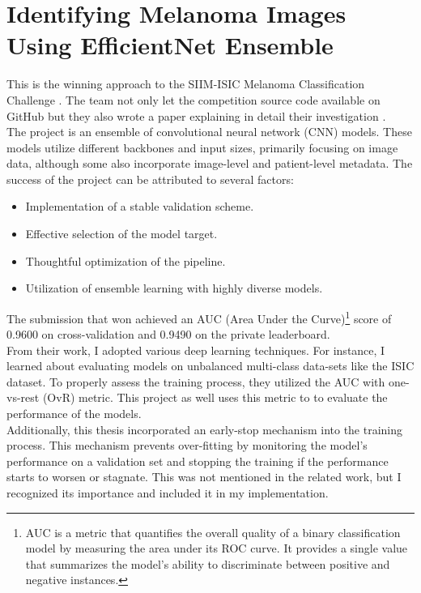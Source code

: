 \section{Identifying Melanoma Images Using EfficientNet Ensemble}

This is the winning approach to the SIIM-ISIC Melanoma Classification Challenge \cite{ISICKaggle}. The team not only let the competition source code available on GitHub \cite{WinningISICGithub} but they also wrote a paper explaining in detail their investigation \cite{WinningISIC}. \\

The project is an ensemble of convolutional neural network (CNN) models. These models utilize different backbones and input sizes, primarily focusing on image data, although some also incorporate image-level and patient-level metadata. The success of the project can be attributed to several factors:

\begin{itemize}
    \item Implementation of a stable validation scheme.
    \item Effective selection of the model target.
    \item Thoughtful optimization of the pipeline.
    \item Utilization of ensemble learning with highly diverse models.
\end{itemize}

The submission that won achieved an AUC (Area Under the Curve)\footnote{AUC is a metric that quantifies the overall quality of a binary classification model by measuring the area under its ROC curve. It provides a single value that summarizes the model's ability to discriminate between positive and negative instances.} score of 0.9600 on cross-validation and 0.9490 on the private leaderboard. \\

From their work, I adopted various deep learning techniques. For instance, I learned about evaluating models on unbalanced multi-class data-sets like the ISIC dataset. To properly assess the training process, they utilized the AUC with one-vs-rest (OvR) metric. This project as well uses this metric to to evaluate the performance of the models. \\

Additionally, this thesis incorporated an early-stop mechanism into the training process. This mechanism prevents over-fitting by monitoring the model's performance on a validation set and stopping the training if the performance starts to worsen or stagnate. This was not mentioned in the related work, but I recognized its importance and included it in my implementation. \\

